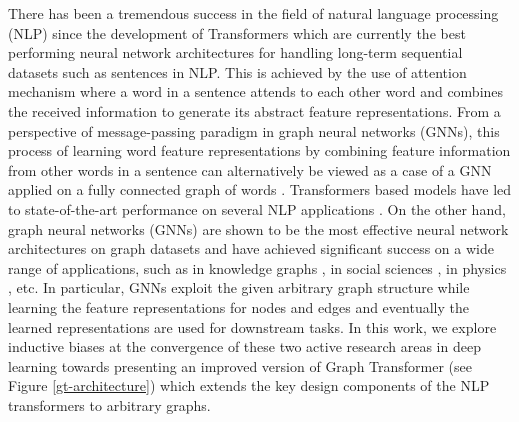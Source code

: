 \documentclass[letterpaper]{article} %
\begin{document}
\noindent There has been a tremendous success in the field of natural language processing (NLP) since the development of Transformers \cite{vaswani2017attention} which are currently the best performing neural network architectures for handling long-term sequential datasets such as sentences in NLP. This is achieved by the use of attention mechanism \cite{bahdanau2014neural} where a word in a sentence attends to each other word and combines the received information to generate its abstract feature representations. From a perspective of message-passing paradigm \cite{gilmer2017neural} in graph neural networks (GNNs), this process of learning word feature representations by combining feature information from other words in a sentence can alternatively be viewed as a case of a GNN applied on a fully connected graph of words \cite{joshi2020transformers}. Transformers based models have led to state-of-the-art performance on several NLP applications \cite{devlin2018bert, radford2018improving, brown2020language}.
On the other hand, graph neural networks (GNNs) are shown to be the most effective neural network architectures on graph datasets and have achieved significant success on a wide range of applications, such as in knowledge graphs \cite{schlichtkrull2018modeling,chami2020low}, in social sciences \cite{monti2019fake}, in physics \cite{cranmer2019learning,sanchez2020learning}, etc. In particular, GNNs exploit the given arbitrary graph structure while learning the feature representations for nodes and edges and eventually the learned representations are used for downstream tasks. In this work, we explore inductive biases at the convergence of these two active research areas in deep learning towards presenting an improved version of Graph Transformer (see Figure \ref{gt-architecture}) which extends the key design components of the NLP transformers to arbitrary graphs.
\end{document}
